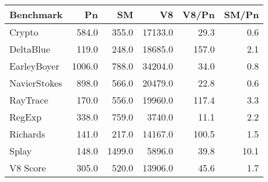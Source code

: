 \begin{tabular}{|l|r|r|r|r|r|}
  \hline
  Benchmark & Pn & SM & V8 & V8/Pn & SM/Pn \\
  \hline \hline
  Crypto & 584.0 & 355.0 & 17133.0 & 29.3 & 0.6\\
  \hline
  DeltaBlue & 119.0 & 248.0 & 18685.0 & 157.0 & 2.1\\
  \hline
  EarleyBoyer & 1006.0 & 788.0 & 34204.0 & 34.0 & 0.8\\
  \hline
  NavierStokes & 898.0 & 566.0 & 20479.0 & 22.8 & 0.6\\
  \hline
  RayTrace & 170.0 & 556.0 & 19960.0 & 117.4 & 3.3\\
  \hline
  RegExp & 338.0 & 759.0 & 3740.0 & 11.1 & 2.2\\
  \hline
  Richards & 141.0 & 217.0 & 14167.0 & 100.5 & 1.5\\
  \hline
  Splay & 148.0 & 1499.0 & 5896.0 & 39.8 & 10.1\\
  \hline
  \hline
  V8 Score & 305.0 & 520.0 & 13906.0 & 45.6 & 1.7\\
  \hline
\end{tabular}
